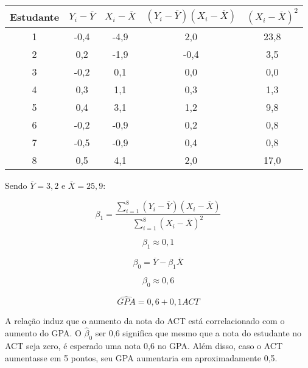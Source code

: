\documentclass[hidelinks,11pt]{book}
\theoremstyle{definition}
\begin{document}
	\begin{center}
	\begin{tabular}{|c|c|c|c|c|}\hline
		\textbf{Estudante} & \textbf{$Y_i - \overline{Y}$} & \textbf{$X_i - \overline{X}$} & \textbf{$(Y_i - \overline{Y})(X_i - \overline{X})$} & $(X_i - \overline{X})^2$ \\\hline
		1 & -0,4 & -4,9 & 2,0 & 23,8 \\\hline
		2 & 0,2 & -1,9 & -0,4 & 3,5\\\hline
		3 & -0,2 & 0,1 & 0,0 & 0,0\\\hline
		4 & 0,3 & 1,1 & 0,3 & 1,3\\\hline
		5 & 0,4 & 3,1 & 1,2 & 9,8\\\hline
		6 & -0,2 & -0,9 & 0,2 & 0,8\\\hline
		7 & -0,5 & -0,9 & 0,4 & 0,8\\\hline
		8 & 0,5 & 4,1 & 2,0 & 17,0\\\hline
	\end{tabular}
\end{center}

Sendo $ \overline{Y} = 3,2$ e $\overline{X} = 25,9$:

\begin{displaymath}
	\beta_1 = \frac{\sum_{i=1}^{8} (Y_i - \overline{Y})(X_i - \overline{X})}   {\sum_{i=1}^{8} (X_i - \overline{X})^2} 
\end{displaymath}


\begin{displaymath}
	\beta_1 \approx 0,1 
\end{displaymath}

\begin{displaymath}
	\beta_0 = \overline{Y} - \beta_1 \overline{X}
\end{displaymath}
	
\begin{displaymath}
	\beta_0 \approx 0,6
\end{displaymath}

\begin{displaymath}
	\widehat{GPA} = 0,6 + 0,1 ACT
\end{displaymath}

A relação induz que o aumento da nota do ACT está correlacionado com o aumento do GPA. O $\hat{\beta}_0$ ser 0,6 significa que mesmo que a nota do estudante no ACT seja zero, é esperado uma nota 0,6 no GPA. Além disso, caso o ACT aumentasse em 5 pontos, seu GPA aumentaria em aproximadamente 0,5.\\
\end{document}
